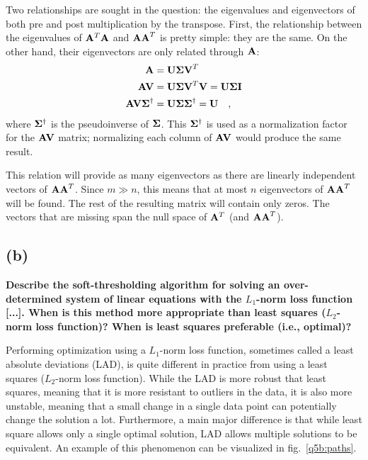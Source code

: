 \documentclass{report}
\begin{document}
Two relationships are sought in the question: the eigenvalues and eigenvectors of both pre and post multiplication by the transpose. First, the relationship between the eigenvalues of $\mathbf{A}^T\mathbf{A}$ and $\mathbf{AA}^T$ is pretty simple: they are the same. On the other hand, their eigenvectors are only related through $\mathbf{A}$:
\begin{align*}
\mathbf{A}  &= \mathbf{U \Sigma V}^T \\
\mathbf{AV} &= \mathbf{U \Sigma V}^T \mathbf{V} = \mathbf{U \Sigma I} \\
\mathbf{AV\Sigma}^\dagger &= \mathbf{U \Sigma \Sigma}^\dagger = \mathbf{U} \quad,
\end{align*}
where $\mathbf{\Sigma}^\dagger$ is the pseudoinverse of $\mathbf{\Sigma}$. This $\mathbf{\Sigma}^\dagger$ is used as a normalization factor for the $\mathbf{AV}$ matrix; normalizing each column of $\mathbf{AV}$ would produce the same result.

This relation will provide as many eigenvectors as there are linearly independent vectors of $\mathbf{AA}^T$. Since $m \gg n$, this means that at most $n$ eigenvectors of $\mathbf{AA}^T$ will be found. The rest of the resulting matrix will contain only zeros. The vectors that are missing span the null space of $\mathbf{A}^T$ (and $\mathbf{AA}^T$).

\subsection{(b)}
\textbf{Describe the soft-thresholding algorithm for solving  an over-determined system of linear equations with the $L_1$-norm loss function [...]. When is this method more appropriate than least squares ($L_2$-norm loss function)? When is least squares preferable (i.e., optimal)?}

Performing optimization using a $L_1$-norm loss function, sometimes called a least absolute deviations (LAD), is quite different in practice from using a least squares ($L_2$-norm loss function). While the LAD is more robust that least squares, meaning that it is more resistant to outliers in the data, it is also more unstable, meaning that a small change in a single data point can potentially change the solution a lot. Furthermore, a main major difference is that while least square allows only a single optimal solution, LAD allows multiple solutions to be equivalent. An example of this phenomenon can be visualized in fig.~\ref{q5b:paths}.
\end{document}
